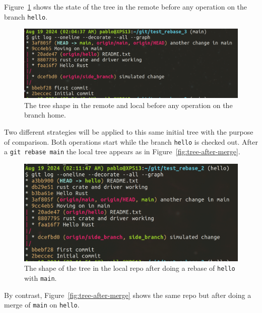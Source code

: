 \documentclass[10pt]{article}
\begin{document}
Figure~\ref{fig:initial-tree} shows the state of the tree in the remote before any operation on the branch \texttt{hello}.

\begin{figure}
    \centering
    \includegraphics[width=\textwidth]{images/Tree_before_any_op.png}
    \caption{The tree shape in the remote and local before any operation on the branch home.}
    \label{fig:initial-tree}
\end{figure}

Two different strategies will be applied to this same initial tree with the purpose of comparison.
Both operations start while the branch \texttt{hello} is checked out. 
After a \texttt{git rebase main} the local tree appears as in Figure~\ref{fig:tree-after-merge}. 


\begin{figure}
    \centering
    \includegraphics[width=\textwidth]{images/Tree_after_rebase_main_on_hello.png}
    \caption{The shape of the tree in the local repo after doing a rebase of \texttt{hello} with \texttt{main}.}
    \label{fig:tree-after-rebase}
\end{figure}

By contrast, Figure~\ref{fig:tree-after-merge} shows the same repo but after doing a merge of \texttt{main} on \texttt{hello}.
\end{document}
